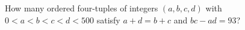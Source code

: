 How many ordered four-tuples of integers $(a,b,c,d)$ with $0 < a < b < c < d < 500$ satisfy $a + d = b + c$ and $bc - ad = 93$?